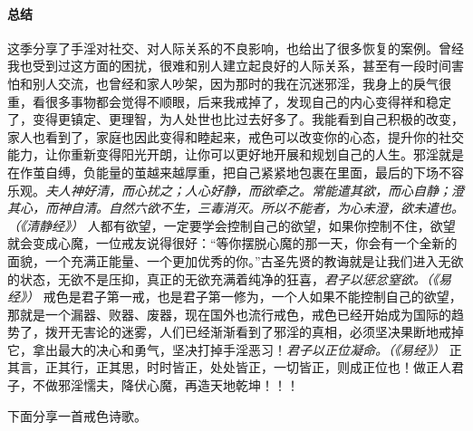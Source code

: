 \paragraph*{总结}

这季分享了手淫对社交、对人际关系的不良影响，也给出了很多恢复的案例。曾经我也受到过这方面的困扰，很难和别人建立起良好的人际关系，甚至有一段时间害怕和别人交流，也曾经和家人吵架，因为那时的我在沉迷邪淫，我身上的戾气很重，看很多事物都会觉得不顺眼，后来我戒掉了，发现自己的内心变得祥和稳定了，变得更镇定、更理智，为人处世也比过去好多了。我能看到自己积极的改变，家人也看到了，家庭也因此变得和睦起来，戒色可以改变你的心态，提升你的社交能力，让你重新变得阳光开朗，让你可以更好地开展和规划自己的人生。邪淫就是在作茧自缚，负能量的茧越来越厚重，把自己紧紧地包裹在里面，最后的下场不容乐观。\textit{夫人神好清，而心扰之；人心好静，而欲牵之。常能遣其欲，而心自静；澄其心，而神自清。自然六欲不生，三毒消灭。所以不能者，为心未澄，欲未遣也。（《清静经》）} 人都有欲望，一定要学会控制自己的欲望，如果你控制不住，欲望就会变成心魔，一位戒友说得很好：“等你摆脱心魔的那一天，你会有一个全新的面貌，一个充满正能量、一个更加优秀的你。”古圣先贤的教诲就是让我们进入无欲的状态，无欲不是压抑，真正的无欲充满着纯净的狂喜，\textit{君子以惩忿窒欲。（《易经》）} 戒色是君子第一戒，也是君子第一修为，一个人如果不能控制自己的欲望，那就是一个漏器、败器、废器，现在国外也流行戒色，戒色已经开始成为国际的趋势了，拨开无害论的迷雾，人们已经渐渐看到了邪淫的真相，必须坚决果断地戒掉它，拿出最大的决心和勇气，坚决打掉手淫恶习！\textit{君子以正位凝命。（《易经》）} 正其言，正其行，正其思，时时皆正，处处皆正，一切皆正，则成正位也！做正人君子，不做邪淫懦夫，降伏心魔，再造天地乾坤！！！

下面分享一首戒色诗歌。

